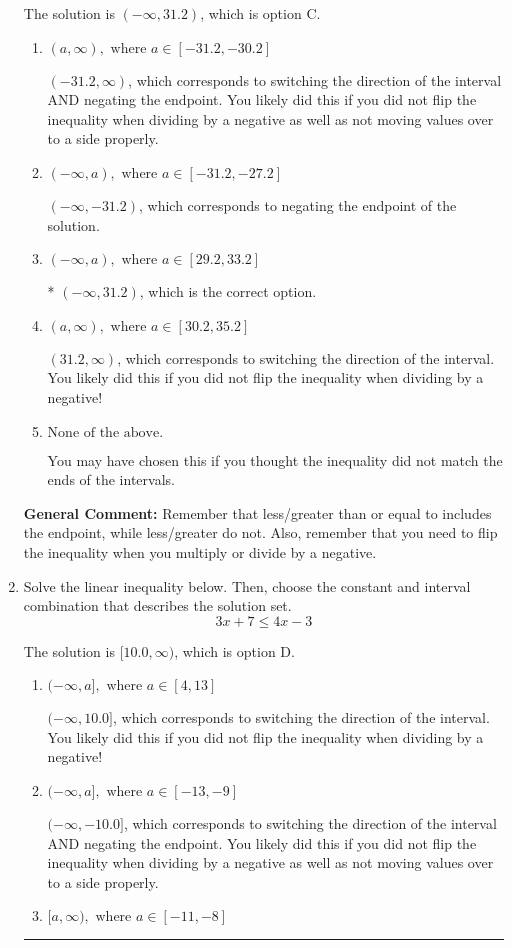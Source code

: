 \documentclass{extbook}[14pt]
\newcommand{\litem}[1]{\item #1

\rule{\textwidth}{0.4pt}}
\begin{document}
\begin{enumerate}
{The solution is \( (-\infty, 31.2) \), which is option C.\begin{enumerate}[label=\Alph*.]
\item \( (a, \infty), \text{ where } a \in [-31.2, -30.2] \)

 $(-31.2, \infty)$, which corresponds to switching the direction of the interval AND negating the endpoint. You likely did this if you did not flip the inequality when dividing by a negative as well as not moving values over to a side properly.
\item \( (-\infty, a), \text{ where } a \in [-31.2, -27.2] \)

 $(-\infty, -31.2)$, which corresponds to negating the endpoint of the solution.
\item \( (-\infty, a), \text{ where } a \in [29.2, 33.2] \)

* $(-\infty, 31.2)$, which is the correct option.
\item \( (a, \infty), \text{ where } a \in [30.2, 35.2] \)

 $(31.2, \infty)$, which corresponds to switching the direction of the interval. You likely did this if you did not flip the inequality when dividing by a negative!
\item \( \text{None of the above}. \)

You may have chosen this if you thought the inequality did not match the ends of the intervals.
\end{enumerate}

\textbf{General Comment:} Remember that less/greater than or equal to includes the endpoint, while less/greater do not. Also, remember that you need to flip the inequality when you multiply or divide by a negative.
}
\litem{
Solve the linear inequality below. Then, choose the constant and interval combination that describes the solution set.
\[ 3x + 7 \leq 4x -3 \]

The solution is \( [10.0, \infty) \), which is option D.\begin{enumerate}[label=\Alph*.]
\item \( (-\infty, a], \text{ where } a \in [4, 13] \)

 $(-\infty, 10.0]$, which corresponds to switching the direction of the interval. You likely did this if you did not flip the inequality when dividing by a negative!
\item \( (-\infty, a], \text{ where } a \in [-13, -9] \)

 $(-\infty, -10.0]$, which corresponds to switching the direction of the interval AND negating the endpoint. You likely did this if you did not flip the inequality when dividing by a negative as well as not moving values over to a side properly.
\item \( [a, \infty), \text{ where } a \in [-11, -8] \)


\end{enumerate}}
\end{enumerate}
\end{document}
